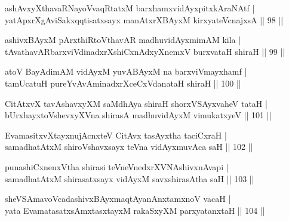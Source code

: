 \begin{shl}
ashAvxyXthavaRNayoVvaqRtatxM barxhamxvidAyxpitxkAraNAtf |\\
yatApxrXgAviSakxqqtisatxsayx manAtxrXBAyxM kirxyateV\s cnajxsA \hfill || 98 ||
\end{shl}
\begin{shl}
ashivxBAyxM pArxthiRtoV\s thavAR madhuvidAyxmimAM kila |\\
tAvathavAR\s barxviVdinadxrXshiCxnAdxyXnemxV burxvataH shiraH \hfill || 99 ||
\end{shl}
\begin{shl}
atoV BayAdimAM vidAyxM yuvABAyxM na barxviVmayxhamf |\\
tamUcatuH pureYvA\s \s vAminadxrXceCxVdanataH shiraH \hfill || 100 ||
\end{shl}
\begin{shl}
CitAtxvX tavAshavxyXM saMdhAya shiraH shorxVSAyxvaheV tataH |\\
bUrxhayxtoV\s shevxyXVna shirasA madhuvidAyxM vimukatxyeV \hfill || 101 ||
\end{shl}
\begin{shl}
EvamasitxvXtayxnujAcnxteV CitAvx tasAyxtha taciCxraH |\\
samadhatAtxM shiroV\s shavxsayx teVna vidAyxmuvAca saH \hfill || 102 ||
\end{shl}
\begin{shl}
punashiCxnenxV\s tha shirasi teVneVnedxrXVNAshivxnAvapi |\\
samadhatAtxM shirasatxsayx vidAyxM savxshirasA\s tha saH \hfill || 103 ||
\end{shl}
\begin{shl}
sheVSAmavoVcadashivxBAyxmaqtAyanAnxtamxnoV vacaH |\\
yata EvamatasatxsAmxtasxtayxM rakaSxyXM parxyatanxtaH \hfill || 104 ||
\end{shl}
